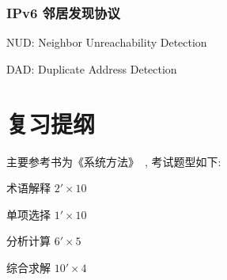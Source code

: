 \documentclass[UTF8,cs4size]{ctexart}
\begin{document}
\subsubsection{IPv6 邻居发现协议}
\begin{compactitem}
  \item NUD: Neighbor Unreachability Detection
  \item DAD: Duplicate Address Detection
\end{compactitem}
\clearpage

\section{复习提纲}
主要参考书为《系统方法》~\cite{peterson2007computer}, 考试题型如下:
\begin{compactitem}
  \item 术语解释 $2' \times 10$
  \item 单项选择 $1' \times 10$
  \item 分析计算 $6' \times 5$
  \item 综合求解 $10' \times 4$
\end{compactitem}

\clearpage



\clearpage
\end{document}

